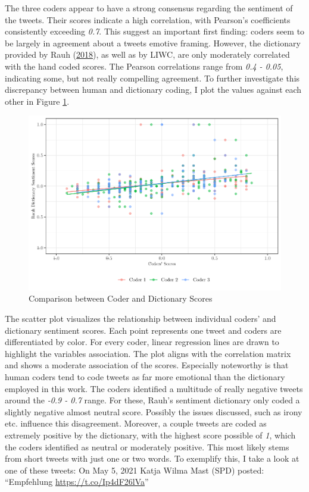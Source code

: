 \documentclass[a4paper,11pt]{article}
\begin{document}
The three coders appear to have a strong consensus regarding the sentiment of the tweets. Their scores indicate a high correlation, with Pearson's coefficients consistently exceeding \emph{0.7}. This suggest an important first finding: coders seem to be largely in agreement about a tweets emotive framing. However, the dictionary provided by Rauh (\protect\hyperlink{ref-rauhValidatingSentimentDictionary2018}{2018}), as well as by LIWC, are only moderately correlated with the hand coded scores. The Pearson correlations range from \emph{0.4 - 0.05}, indicating some, but not really compelling agreement. To further investigate this discrepancy between human and dictionary coding, I plot the values against each other in Figure \texttt{\ref{fig:humancoderscatter}}.
\begin{figure}[H]

{\centering \includegraphics[width=1\linewidth]{thesis_files/figure-latex/humancoderscatter-1} 

}

\caption{Comparison between Coder and Dictionary Scores}\label{fig:humancoderscatter}
\end{figure}
The scatter plot visualizes the relationship between individual coders' and dictionary sentiment scores. Each point represents one tweet and coders are differentiated by color. For every coder, linear regression lines are drawn to highlight the variables association. The plot aligns with the correlation matrix and shows a moderate association of the scores. Especially noteworthy is that human coders tend to code tweets as far more emotional than the dictionary employed in this work. The coders identified a multitude of really negative tweets around the \emph{-0.9 - 0.7} range. For these, Rauh's sentiment dictionary only coded a slightly negative almost neutral score. Possibly the issues discussed, such as irony etc. influence this disagreement. Moreover, a couple tweets are coded as extremely positive by the dictionary, with the highest score possible of \emph{1}, which the coders identified as neutral or moderately positive. This most likely stems from short tweets with just one or two words. To exemplify this, I take a look at one of these tweets: On May 5, 2021 Katja Wilma Mast (SPD) posted: ``Empfehlung \url{https://t.co/Ip4dF26lVa}''
\end{document}
